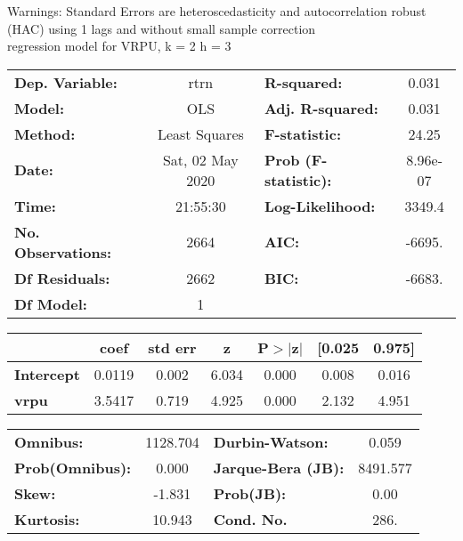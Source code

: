 Warnings: \newline
 [1] Standard Errors are heteroscedasticity and autocorrelation robust (HAC) using 1 lags and without small sample correction\\ 

regression model for VRPU, k = 2 h = 3\begin{center}
\begin{tabular}{lclc}
\toprule
\textbf{Dep. Variable:}    &       rtrn       & \textbf{  R-squared:         } &     0.031   \\
\textbf{Model:}            &       OLS        & \textbf{  Adj. R-squared:    } &     0.031   \\
\textbf{Method:}           &  Least Squares   & \textbf{  F-statistic:       } &     24.25   \\
\textbf{Date:}             & Sat, 02 May 2020 & \textbf{  Prob (F-statistic):} &  8.96e-07   \\
\textbf{Time:}             &     21:55:30     & \textbf{  Log-Likelihood:    } &    3349.4   \\
\textbf{No. Observations:} &        2664      & \textbf{  AIC:               } &    -6695.   \\
\textbf{Df Residuals:}     &        2662      & \textbf{  BIC:               } &    -6683.   \\
\textbf{Df Model:}         &           1      & \textbf{                     } &             \\
\bottomrule
\end{tabular}
\begin{tabular}{lcccccc}
                   & \textbf{coef} & \textbf{std err} & \textbf{z} & \textbf{P$> |$z$|$} & \textbf{[0.025} & \textbf{0.975]}  \\
\midrule
\textbf{Intercept} &       0.0119  &        0.002     &     6.034  &         0.000        &        0.008    &        0.016     \\
\textbf{vrpu}      &       3.5417  &        0.719     &     4.925  &         0.000        &        2.132    &        4.951     \\
\bottomrule
\end{tabular}
\begin{tabular}{lclc}
\textbf{Omnibus:}       & 1128.704 & \textbf{  Durbin-Watson:     } &    0.059  \\
\textbf{Prob(Omnibus):} &   0.000  & \textbf{  Jarque-Bera (JB):  } & 8491.577  \\
\textbf{Skew:}          &  -1.831  & \textbf{  Prob(JB):          } &     0.00  \\
\textbf{Kurtosis:}      &  10.943  & \textbf{  Cond. No.          } &     286.  \\
\bottomrule
\end{tabular}
\end{center}

